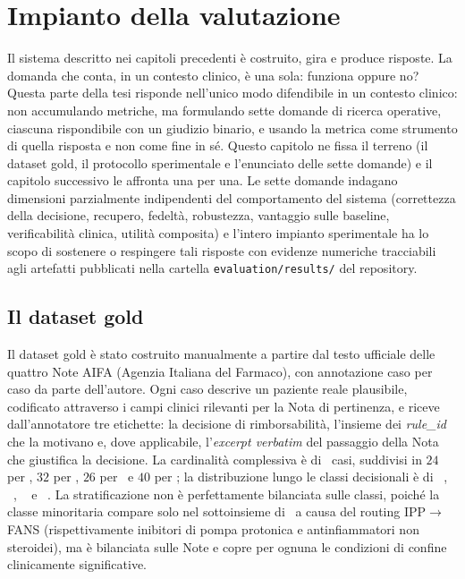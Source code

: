 \chapter{Impianto della valutazione}
\label{ch:impianto}

Il sistema descritto nei capitoli precedenti è costruito, gira e produce
risposte. La domanda che conta, in un contesto clinico, è una sola:
funziona oppure no? Questa parte della tesi risponde nell'unico modo
difendibile in un contesto clinico: non accumulando metriche, ma
formulando sette domande di ricerca operative, ciascuna rispondibile
con un giudizio binario, e usando la metrica come strumento di quella
risposta e non come fine in sé. Questo capitolo ne fissa il terreno (il
dataset gold, il protocollo sperimentale e l'enunciato delle sette domande)
e il capitolo successivo le affronta una per una. Le sette domande indagano dimensioni
parzialmente indipendenti del comportamento del sistema (correttezza
della decisione, recupero, fedeltà, robustezza, vantaggio sulle baseline,
verificabilità clinica, utilità composita) e l'intero impianto
sperimentale ha lo scopo di sostenere o respingere tali risposte con
evidenze numeriche tracciabili agli artefatti pubblicati nella cartella
\texttt{evaluation/results/} del repository.

\section{Il dataset gold}
\label{sec:gold}

Il dataset gold è stato costruito manualmente a partire dal testo ufficiale delle quattro Note AIFA (Agenzia Italiana del Farmaco), con annotazione caso per caso da parte dell'autore. Ogni caso descrive un paziente reale plausibile, codificato attraverso i campi clinici rilevanti per la Nota di pertinenza, e riceve dall'annotatore tre etichette: la decisione di rimborsabilità, l'insieme dei \emph{rule\_id} che la motivano e, dove applicabile, l'\emph{excerpt verbatim} del passaggio della Nota che giustifica la decisione. La cardinalità complessiva è di \goldn\ casi, suddivisi in $24$ per \notezero, $32$ per \notetredici, $26$ per \notesessanta\ e $40$ per \notenova; la distribuzione lungo le classi decisionali è di \goldRimb\ , \goldNonRimb\ , \goldNonDet\  e \goldRouted\ . La stratificazione non è perfettamente bilanciata sulle classi, poiché la classe minoritaria  compare solo nel sottoinsieme di \notezero\ a causa del routing IPP$\to$FANS (rispettivamente inibitori di pompa protonica e antinfiammatori non steroidei), ma è bilanciata sulle Note e copre per ognuna le condizioni di confine clinicamente significative.


